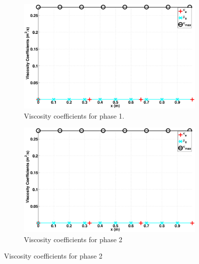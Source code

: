\documentclass[preprint,10pt]{elsarticle}
\begin{document}
%
\begin{figure}[H]
        \centering
        \begin{subfigure}[b]{0.495\textwidth}
                \centering
                \includegraphics[width=\textwidth]{figures/liquid_viscosity.eps}
                \caption{Viscosity coefficients for phase 1.}
                \label{fig:adv-vf-1}
        \end{subfigure}%
        \begin{subfigure}[b]{0.495\textwidth}
                \centering
                \includegraphics[width=\textwidth]{figures/liquid_viscosity.eps}
                \caption{Viscosity coefficients for phase 2}
                \label{fig:adv-vf-2}
        \end{subfigure}
        

\end{figure}
\end{document}
